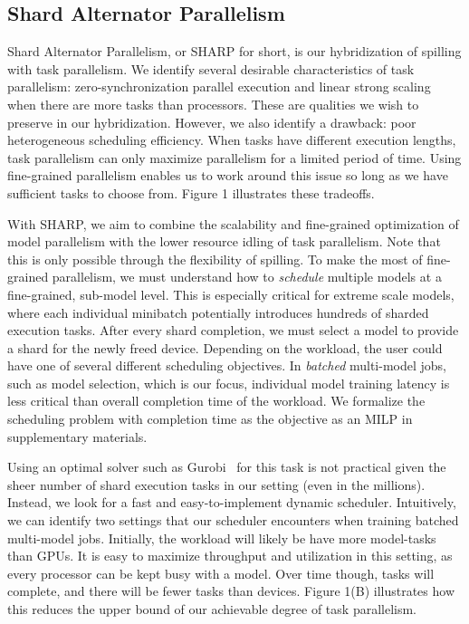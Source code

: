 \documentclass{article}
\begin{document}
\subsection{Shard Alternator Parallelism}

Shard Alternator Parallelism, or SHARP for short, is our hybridization of spilling with task parallelism. We identify several desirable characteristics of task parallelism: zero-synchronization parallel execution and linear strong scaling when there are more tasks than processors. These are qualities we wish to preserve in our hybridization. However, we also identify a drawback: poor heterogeneous scheduling efficiency. When tasks have different execution lengths, task parallelism can only maximize parallelism for a limited period of time. Using fine-grained parallelism enables us to work around this issue so long as we have sufficient tasks to choose from. Figure 1 illustrates these tradeoffs.

With SHARP, we aim to combine the scalability and fine-grained optimization of model parallelism with the lower resource idling of task parallelism. Note that this is only possible through the flexibility of spilling. To make the most of fine-grained parallelism, we must understand how to \textit{schedule} multiple models at a fine-grained, sub-model level. This is especially critical for extreme scale models, where each individual minibatch potentially introduces hundreds of sharded execution tasks. After every shard completion, we must select a model to provide a shard for the newly freed device. Depending on the workload, the user could have one of several different scheduling objectives. In \textit{batched} multi-model jobs, such as model selection, which is our focus, individual model training latency is less critical than overall completion time of the workload. We formalize the scheduling problem with completion time as the objective as an MILP in supplementary materials.

Using an optimal solver such as Gurobi~\cite{gurobi} for this task is not practical given the sheer number of shard execution tasks in our setting (even in the millions). Instead, we look for a fast and easy-to-implement dynamic scheduler. Intuitively, we can identify two settings that our scheduler encounters when training batched multi-model jobs. Initially, the workload will likely be have more model-tasks than GPUs. It is easy to maximize throughput and utilization in this setting, as every processor can be kept busy with a model. Over time though, tasks will complete, and there will be fewer tasks than devices. Figure 1(B) illustrates how this reduces the upper bound of our achievable degree of task parallelism.
\end{document}
